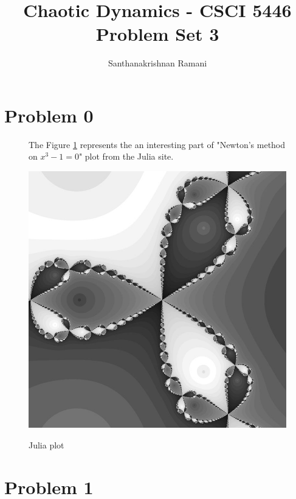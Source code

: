\documentclass[11pt,a4paper]{article}
\date{\displaydate{date}}
\title{\textbf{Chaotic Dynamics - CSCI 5446} \\
Problem Set 3}
\author{Santhanakrishnan Ramani}
\begin{document}
\maketitle

\section*{Problem 0}
\begin{figure}[H]
{
The Figure \ref{fig:prob0} represents the an interesting part of "Newton's method on $x^3 - 1 = 0$" plot from the Julia site. \par\bigskip
\centering 
\includegraphics[scale=0.8]{images/julia.jpg}
\caption{Julia plot}\par\medskip
\label{fig:prob0}
}
\end{figure}

\section*{Problem 1}
\end{document}
